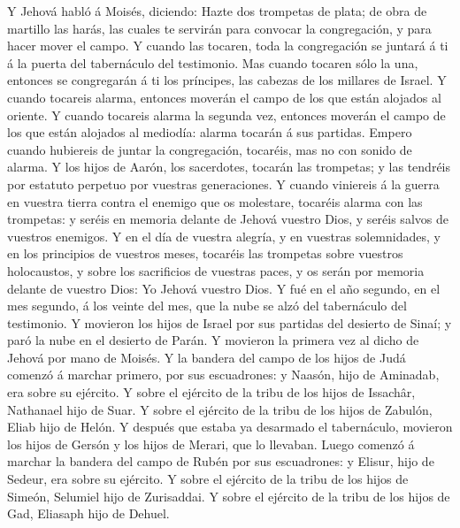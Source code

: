  Y Jehová habló á Moisés, diciendo:  Hazte
dos trompetas de plata; de obra de martillo las harás, las cuales te
servirán para convocar la congregación, y para hacer mover el campo.
 Y cuando las tocaren, toda la congregación se juntará á
ti á la puerta del tabernáculo del testimonio.  Mas cuando
tocaren sólo la una, entonces se congregarán á ti los príncipes, las
cabezas de los millares de Israel.  Y cuando tocareis
alarma, entonces moverán el campo de los que están alojados al oriente.
 Y cuando tocareis alarma la segunda vez, entonces moverán
el campo de los que están alojados al mediodía: alarma tocarán á sus
partidas.  Empero cuando hubiereis de juntar la
congregación, tocaréis, mas no con sonido de alarma.  Y
los hijos de Aarón, los sacerdotes, tocarán las trompetas; y las
tendréis por estatuto perpetuo por vuestras generaciones. 
Y cuando viniereis á la guerra en vuestra tierra contra el enemigo que
os molestare, tocaréis alarma con las trompetas: y seréis en memoria
delante de Jehová vuestro Dios, y seréis salvos de vuestros enemigos.
 Y en el día de vuestra alegría, y en vuestras
solemnidades, y en los principios de vuestros meses, tocaréis las
trompetas sobre vuestros holocaustos, y sobre los sacrificios de
vuestras paces, y os serán por memoria delante de vuestro Dios: Yo
Jehová vuestro Dios.  Y fué en el año segundo, en el mes
segundo, á los veinte del mes, que la nube se alzó del tabernáculo del
testimonio.  Y movieron los hijos de Israel por sus
partidas del desierto de Sinaí; y paró la nube en el desierto de Parán.
 Y movieron la primera vez al dicho de Jehová por mano de
Moisés.  Y la bandera del campo de los hijos de Judá
comenzó á marchar primero, por sus escuadrones: y Naasón, hijo de
Aminadab, era sobre su ejército.  Y sobre el ejército de
la tribu de los hijos de Issachâr, Nathanael hijo de Suar.
 Y sobre el ejército de la tribu de los hijos de Zabulón,
Eliab hijo de Helón.  Y después que estaba ya desarmado
el tabernáculo, movieron los hijos de Gersón y los hijos de Merari, que
lo llevaban.  Luego comenzó á marchar la bandera del
campo de Rubén por sus escuadrones: y Elisur, hijo de Sedeur, era sobre
su ejército.  Y sobre el ejército de la tribu de los
hijos de Simeón, Selumiel hijo de Zurisaddai.  Y sobre el
ejército de la tribu de los hijos de Gad, Eliasaph hijo de Dehuel.
